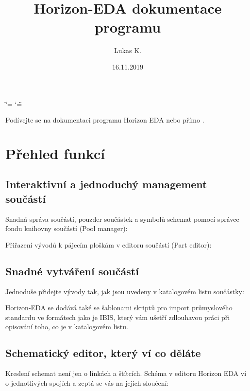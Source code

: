 \documentclass[letterpaper,10pt,czech]{sphinxmanual}
\title{Horizon-EDA dokumentace programu}
\date{16.11.2019}
\author{Lukas K.}
\begin{document}
\ifdefined\shorthandoff
  \ifnum\catcode`\=\string=\active\shorthandoff{=}\fi
  \ifnum\catcode`\"=\active{}\fi
\fi

\pagestyle{empty}
\sphinxmaketitle
\pagestyle{plain}
\sphinxtableofcontents
\pagestyle{normal}
\label{\detokenize{index::doc}}


Podívejte se na dokumentaci programu Horizon EDA {\hyperref[\detokenize{feature-overview_cz::doc}]{}} nebo přímo {\hyperref[\detokenize{getting-started_cz::doc}]{}}.

\noindent{}


\chapter{Přehled funkcí}
\label{\detokenize{feature-overview_cz:prehled-funkci}}\label{\detokenize{feature-overview_cz::doc}}

\section{Interaktivní a jednoduchý management součástí}
\label{\detokenize{feature-overview_cz:interaktivni-a-jednoduchy-management-soucasti}}
Snadná správa součástí, pouzder součástek a symbolů schemat pomocí správce fondu knihovny součástí (Pool manager):

\noindent{}

Přiřazení vývodů k pájecím ploškám v editoru součástí (Part editor):

\noindent{}


\section{Snadné vytváření součástí}
\label{\detokenize{feature-overview_cz:snadne-vytvareni-soucasti}}
Jednoduše přidejte vývody tak, jak jsou uvedeny v katalogovém listu součástky:

\noindent{}

Horizon-EDA se dodává také se šablonami skriptů pro import průmyslového standardu
ve formátech jako je IBIS, který vám ušetří zdlouhavou práci při opisování toho, co je v katalogovém listu.


\section{Schematický editor, který ví co děláte}
\label{\detokenize{feature-overview_cz:schematicky-editor-ktery-vi-co-delate}}
Kreslení schemat není jen o linkách a štítcích. Schéma v editoru Horizon EDA
ví o jednotlivých spojích a zeptá se vás na jejich sloučení:
\end{document}
